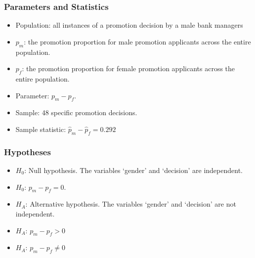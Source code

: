 \documentclass{beamer}
\begin{document}
\begin{frame}
  \frametitle{Parameters and Statistics}
  \begin{itemize}
    \item[] 
      Population: all instances of a promotion decision by a
      male bank managers
      \vspace{0.5cm}
    \item[] 
      $p_m$: the promotion proportion for male promotion applicants
      across the entire population.
      \vspace{0.5cm}
    \item[] 
      $p_f$: the promotion proportion for female promotion applicants
      across the entire population.
      \vspace{0.5cm}
    \item[] 
      Parameter: $p_m - p_f$. 
      \vspace{0.5cm}
    \item[] 
      Sample: 48 specific promotion decisions.
      \vspace{0.5cm}
    \item[] 
      Sample statistic: $\hat{p}_m - \hat{p}_f = 0.292$
  \end{itemize}
\end{frame}

\begin{frame}
  \frametitle{Hypotheses}
  \begin{itemize}
    \item[] $H_0$: Null hypothesis. The variables `gender' and
    `decision' are independent. 
      \vspace{0.5cm}
    \item[] $H_0$: $p_m - p_f = 0$. 
      \vspace{0.5cm}
    \item[] $H_A$: Alternative hypothesis. The variables `gender' and
    `decision' are not independent. 
      \vspace{0.5cm}
    \item[] $H_A$: $p_m - p_f > 0$
      \vspace{0.5cm}
    \item[] $H_A$: $p_m - p_f \neq 0$
  \end{itemize}
\end{frame}
\end{document}
